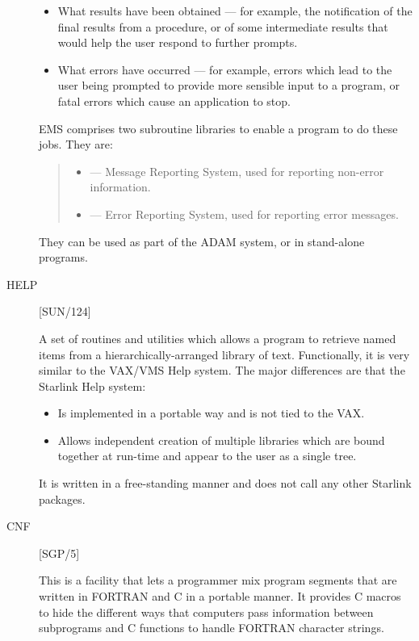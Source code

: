 \begin{description}
\begin {itemize}
\item What results have been obtained --- for example, the notification of  the
final results from a procedure, or of some intermediate results that would help
the user respond to further prompts. 

\item What errors have occurred --- for example, errors which lead to the user
being prompted to provide more sensible input to a program, or fatal
errors which cause an application to stop.
\end {itemize}

EMS comprises two subroutine libraries to enable a program to do these jobs.
They are:

\begin {quote}
\begin {itemize}
\item [MSG] --- Message Reporting System, used for reporting
non-error information. 
\item [ERR] --- Error Reporting System, used for reporting error
messages.
\end {itemize}
\end {quote}
They can be used as part of the ADAM system, or in stand-alone programs.

\item [HELP] \hfill [SUN/124]

A set of routines and utilities which allows a program to retrieve named
items from a hierarchically-arranged library of text.
Functionally, it is very similar to the VAX/VMS Help system.
The major differences are that the Starlink Help system:
\begin{itemize}
\item Is implemented in a portable way and is not tied to the VAX.
\item Allows independent creation of multiple libraries which are bound
together at run-time and appear to the user as a single tree.
\end{itemize}
It is written in a free-standing manner and does not call any other Starlink
packages.

\item [CNF] \hfill [SGP/5]

This is a facility that lets a programmer mix program segments that are written
in FORTRAN and C in a portable manner.
It provides C macros to hide the different ways that computers pass information
between subprograms and C functions to handle FORTRAN character strings.

\end{description}

